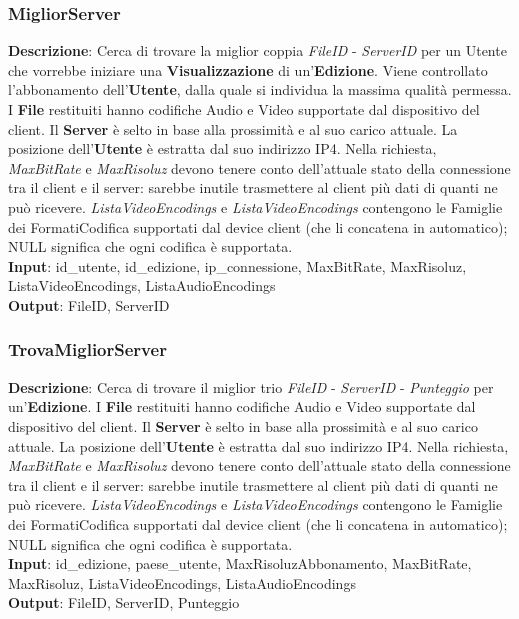\documentclass{article}
\begin{document}
\subsubsection{MigliorServer}
\textbf{Descrizione}: Cerca di trovare la miglior coppia \textit{FileID} - \textit{ServerID} per un Utente che vorrebbe iniziare una \textbf{Visualizzazione} di un'\textbf{Edizione}. Viene controllato l'abbonamento dell'\textbf{Utente}, dalla quale si individua la massima qualità permessa. I \textbf{File} restituiti hanno codifiche Audio e Video supportate dal dispositivo del client. Il \textbf{Server} è selto in base alla prossimità e al suo carico attuale. La posizione dell'\textbf{Utente} è estratta dal suo indirizzo IP4. Nella richiesta, \textit{MaxBitRate} e \textit{MaxRisoluz} devono tenere conto dell'attuale stato della connessione tra il client e il server: sarebbe inutile trasmettere al client più dati di quanti ne può ricevere. \textit{ListaVideoEncodings} e \textit{ListaVideoEncodings} contengono le Famiglie dei FormatiCodifica supportati dal device client (che li concatena in automatico); NULL significa che ogni codifica è supportata. \\
\textbf{Input}: id\_utente, id\_edizione, ip\_connessione, MaxBitRate, MaxRisoluz, ListaVideoEncodings, ListaAudioEncodings\\
\textbf{Output}: FileID, ServerID \\
\subsubsection{TrovaMigliorServer}
\textbf{Descrizione}: Cerca di trovare il miglior trio \textit{FileID} - \textit{ServerID} - \textit{Punteggio} per un'\textbf{Edizione}. I \textbf{File} restituiti hanno codifiche Audio e Video supportate dal dispositivo del client. Il \textbf{Server} è selto in base alla prossimità e al suo carico attuale. La posizione dell'\textbf{Utente} è estratta dal suo indirizzo IP4. Nella richiesta, \textit{MaxBitRate} e \textit{MaxRisoluz} devono tenere conto dell'attuale stato della connessione tra il client e il server: sarebbe inutile trasmettere al client più dati di quanti ne può ricevere. \textit{ListaVideoEncodings} e \textit{ListaVideoEncodings} contengono le Famiglie dei FormatiCodifica supportati dal device client (che li concatena in automatico); NULL significa che ogni codifica è supportata. \\
\textbf{Input}: id\_edizione, paese\_utente, MaxRisoluzAbbonamento, MaxBitRate, MaxRisoluz, ListaVideoEncodings, ListaAudioEncodings\\
\textbf{Output}: FileID, ServerID, Punteggio \\
\end{document}
